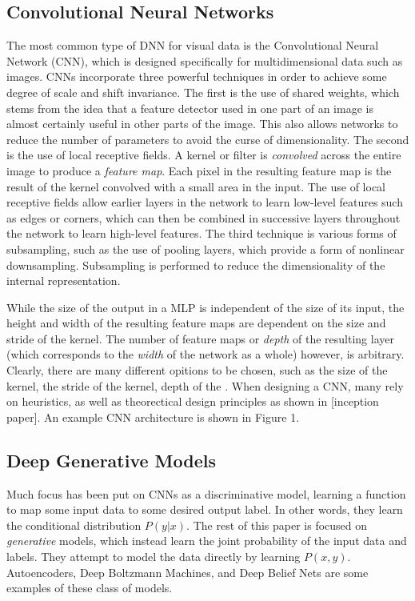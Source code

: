 \documentclass{article}
\begin{document}
\subsection{Convolutional Neural Networks}
\noindent The most common type of DNN for visual data is the Convolutional Neural Network (CNN), which is designed specifically for
multidimensional data such as images. CNNs incorporate three powerful techniques in order to achieve some degree of scale and shift invariance.
The first is the use of shared weights, which stems from the idea that a feature detector used in one part of an image is almost certainly useful in
other parts of the image. This also allows networks to reduce the number of parameters to avoid the curse of dimensionality. The second is the use of
local receptive fields. A kernel or filter is \textit{convolved} across the entire
image to produce a \textit{feature map}. Each pixel in the resulting feature map is the result of the kernel convolved with a small area in the input.
The use of local receptive fields allow earlier layers in the network to learn low-level features such as edges or corners, which can then be combined
in successive layers throughout the network to learn high-level features. The third technique is various forms of subsampling, such as the use of pooling
layers, which provide a form of nonlinear downsampling. Subsampling is performed to reduce the dimensionality of the internal representation. \newline

\noindent While the size of the output in a MLP is independent of the size of its input,
the height and width of the resulting feature maps are dependent on the size and stride of the kernel. The number of feature maps or \textit{depth} of the
resulting layer (which corresponds to the \textit{width} of the network as a whole) however, is arbitrary. Clearly, there are many different opitions to be chosen,
such as the size of the kernel, the stride of the kernel, depth of the . When designing a CNN, many rely on heuristics, as well as theorectical
design principles as shown in [inception paper]. An example CNN architecture is shown in Figure 1. \newline

\subsection{Deep Generative Models}
\noindent Much focus has been put on CNNs as a discriminative model, learning a function to map some input data to some desired output label. In other words,
they learn the conditional distribution $P(y|x)$. The rest of this paper is focused on \textit{generative} models, which instead learn the joint
probability of the input data and labels. They attempt to model the data directly by learning $P(x,y)$. Autoencoders, Deep Boltzmann Machines, and
Deep Belief Nets are some examples of these class of models.
\end{document}
